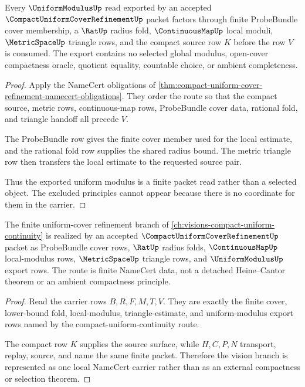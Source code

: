 \begin{theorem}
\label{thm:compact-uniform-cover-refinement-uniform-modulus-export}
Every $\UniformModulusUp$ read exported by an accepted $\CompactUniformCoverRefinementUp$ packet factors through finite ProbeBundle cover membership, a $\RatUp$ radius fold, $\ContinuousMapUp$ local moduli, $\MetricSpaceUp$ triangle rows, and the compact source row $K$ before the row $V$ is consumed. The export contains no selected global modulus, open-cover compactness oracle, quotient equality, countable choice, or ambient completeness.
\end{theorem}
\begin{proof}
Apply the NameCert obligations of \autoref{thm:compact-uniform-cover-refinement-namecert-obligations}. They order the route so that the compact source, metric rows, continuous-map rows, ProbeBundle cover data, rational fold, and triangle handoff all precede $V$.

The ProbeBundle row gives the finite cover member used for the local estimate, and the rational fold row supplies the shared radius bound. The metric triangle row then transfers the local estimate to the requested source pair.

Thus the exported uniform modulus is a finite packet read rather than a selected object. The excluded principles cannot appear because there is no coordinate for them in the carrier.
\end{proof}

\begin{theorem}
\label{thm:compact-uniform-cover-refinement-vision-route}
The finite uniform-cover refinement branch of \autoref{ch:visions-compact-uniform-continuity} is realized by an accepted $\CompactUniformCoverRefinementUp$ packet as ProbeBundle cover rows, $\RatUp$ radius folds, $\ContinuousMapUp$ local-modulus rows, $\MetricSpaceUp$ triangle rows, and $\UniformModulusUp$ export rows. The route is finite NameCert data, not a detached Heine--Cantor theorem or an ambient compactness principle.
\end{theorem}
\begin{proof}
Read the carrier rows $B,R,F,M,T,V$. They are exactly the finite cover, lower-bound fold, local-modulus, triangle-estimate, and uniform-modulus export rows named by the compact-uniform-continuity route.

The compact row $K$ supplies the source surface, while $H,C,P,N$ transport, replay, source, and name the same finite packet. Therefore the vision branch is represented as one local NameCert carrier rather than as an external compactness or selection theorem.
\end{proof}

